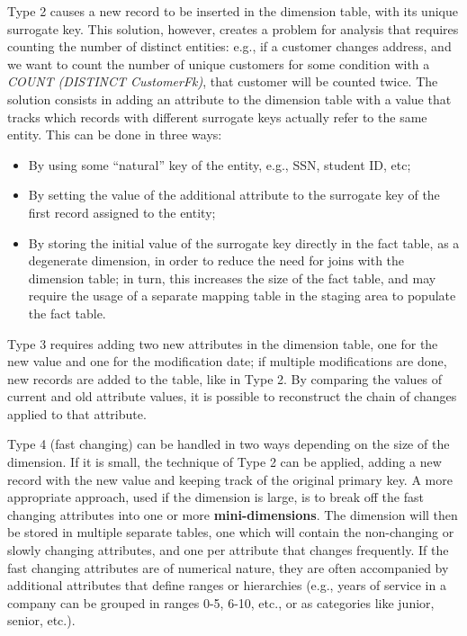 Type 2 causes a new record to be inserted in the dimension table, with its unique surrogate key. This solution, however, creates a problem for analysis that requires counting the number of distinct entities: e.g., if a customer changes address, and we want to count the number of unique customers for some condition with a \textit{COUNT (DISTINCT CustomerFk)}, that customer will be counted twice. The solution consists in adding an attribute to the dimension table with a value that tracks which records with different surrogate keys actually refer to the same entity. This can be done in three ways:
\begin{itemize}
    \item By using some ``natural'' key of the entity, e.g., SSN, student ID, etc;
    \item By setting the value of the additional attribute to the surrogate key of the first record assigned to the entity;
    \item By storing the initial value of the surrogate key directly in the fact table, as a degenerate dimension, in order to reduce the need for joins with the dimension table; in turn, this increases the size of the fact table, and may require the usage of a separate mapping table in the staging area to populate the fact table.
\end{itemize} 

Type 3 requires adding two new attributes in the dimension table, one for the new value and one for the modification date; if multiple modifications are done, new records are added to the table, like in Type 2. By comparing the values of current and old attribute values, it is possible to reconstruct the chain of changes applied to that attribute.

Type 4 (fast changing) can be handled in two ways depending on the size of the dimension. If it is small, the technique of Type 2 can be applied, adding a new record with the new value and keeping track of the original primary key. A more appropriate approach, used if the dimension is large, is to break off the fast changing attributes into one or more \textbf{mini-dimensions}. The dimension will then be stored in multiple separate tables, one which will contain the non-changing or slowly changing attributes, and one per attribute that changes frequently. If the fast changing attributes are of numerical nature, they are often accompanied by additional attributes that define ranges or hierarchies (e.g., years of service in a company can be grouped in ranges 0-5, 6-10, etc., or as categories like junior, senior, etc.).

